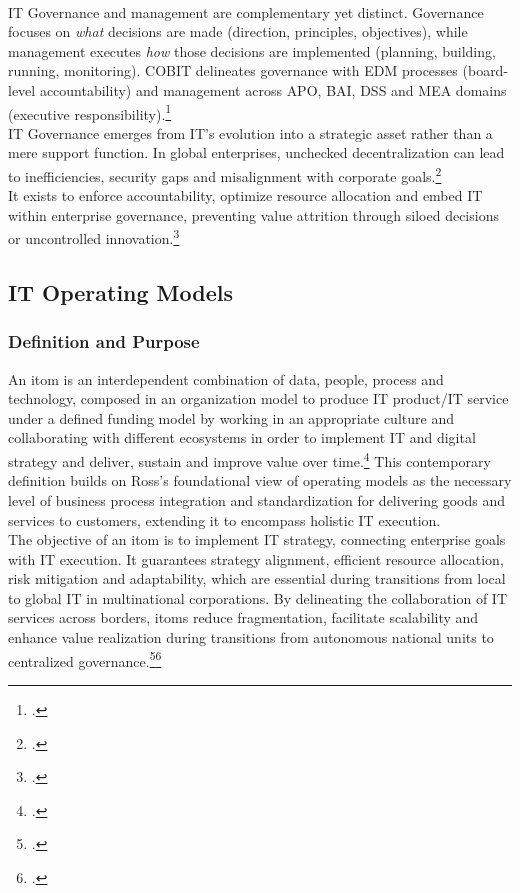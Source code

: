 \\
IT Governance and management are complementary yet distinct.
Governance focuses on \textit{what} decisions are made (direction, principles, objectives), while management executes \textit{how} those decisions are implemented (planning, building, running, monitoring).
COBIT delineates governance with \Gls{EDM} processes (board-level accountability) and management across \Gls{APO}, \Gls{BAI}, \Gls{DSS} and \Gls{MEA} domains (executive responsibility).\footcite[11-13]{isacaCOBIT2019Framework2018}
\\
IT Governance emerges from \ac{IT}'s evolution into a strategic asset rather than a mere support function.
In global enterprises, unchecked decentralization can lead to inefficiencies, security gaps and misalignment with corporate goals.\footcite[3-5]{ionitaITGovernanceGlobal2009}
\\
It exists to enforce accountability, optimize resource allocation and embed IT within enterprise governance, preventing value attrition through siloed decisions or uncontrolled innovation.\footcite[12]{isacaCOBIT2019Framework2018}

\subsection{IT Operating Models}
\label{subsec:ITOperatingModels}
\subsubsection{Definition and Purpose}
An \ac{itom} is \glqq{}an interdependent combination of data, people, process and technology, composed in an organization model to produce \Gls{IT product}/\Gls{IT service} under a defined funding model by working in an appropriate culture and collaborating with different ecosystems in order to implement IT and digital strategy and deliver, sustain and improve value over time.\grqq{}\footcite[17]{sulemanITOperatingModels2025}
This contemporary definition builds on Ross's \cite[1]{rossForgetStrategyFocus2005} foundational view of operating models as \glqq{}the necessary level of business process integration and standardization for delivering goods and services to customers\grqq{}, extending it to encompass holistic IT execution.
\\
The objective of an \ac{itom} is to implement IT strategy, connecting enterprise goals with IT execution.
It guarantees strategy alignment, efficient resource allocation, risk mitigation and adaptability, which are essential during transitions from local to global IT in multinational corporations.
By delineating the collaboration of IT services across borders, \ac{itom}s reduce fragmentation, facilitate scalability and enhance value realization during transitions from autonomous national units to centralized governance.\footcite[6]{sulemanITOperatingModels2025}\footcite[3-4]{rossForgetStrategyFocus2005}

